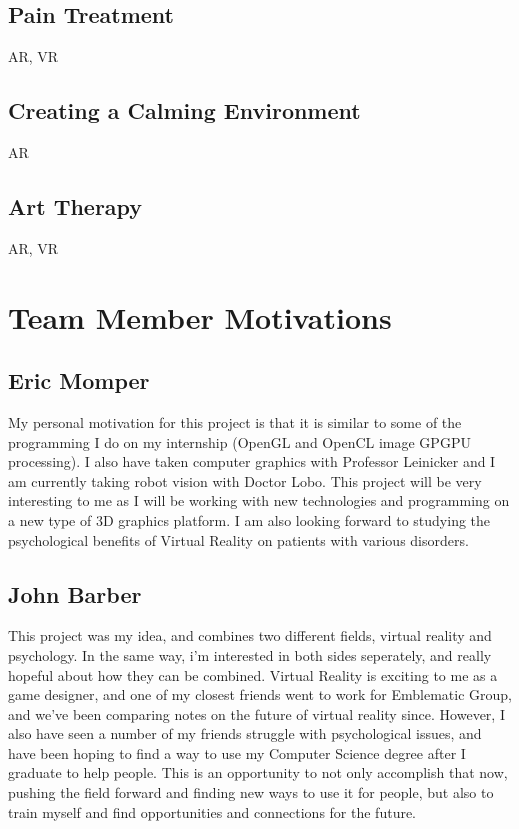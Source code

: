\documentclass[a4paper,10pt]{article}
\begin{document}
	\subsection{Pain Treatment}
	AR, VR
	\subsection{Creating a Calming Environment}
	AR
	\subsection{Art Therapy}
	AR, VR
	\pagebreak
	
	\section{Team Member Motivations}
	\subsection{Eric Momper}
	My personal motivation for this project is that it is similar to some of the programming I do on my internship (OpenGL and OpenCL image GPGPU processing).
	I also have taken computer graphics with Professor Leinicker and I am currently taking robot vision with Doctor Lobo. This project will be very interesting to me as  
	I will be working with new technologies and programming on a new type of 3D graphics platform. I am also looking forward to studying the psychological benefits
	of Virtual Reality on patients with various disorders.  
	
	\subsection{John Barber}
	This project was my idea, and combines two different fields, virtual reality and psychology.  In the same way, i'm interested in both 
	sides seperately, and really hopeful about how they can be combined.  Virtual Reality is exciting to me as a game designer, 
	and one of my closest friends went to work for Emblematic Group, and we've been comparing notes on the future of virtual reality since.  
	However, I also have seen a number of my friends struggle with psychological issues, and have been hoping to find a way to use my Computer 
	Science degree after I graduate to help people.  This is an opportunity to not only accomplish that now, pushing the field forward and finding 
	new ways to use it for people, but also to train myself and find opportunities and connections for the future.
\end{document}
